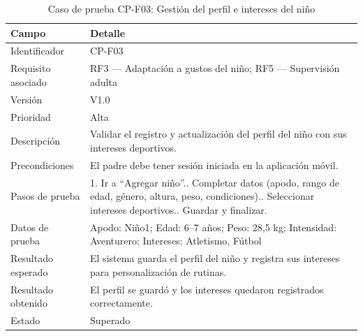 				\begin{table}[H]
					\centering\small
					\caption{Caso de prueba CP-F03: Gestión del perfil e intereses del niño}
					\label{tab:cpf03}
					\begin{tabular}{p{3cm}p{12.0cm}}
						\hline
						\textbf{Campo} & \textbf{Detalle}\\
						\hline
						Identificador & CP-F03\\
						Requisito asociado & RF3 --- Adaptación a gustos del niño; RF5 --- Supervisión adulta\\
						Versión & V1.0\\
						Prioridad & Alta\\
						Descripción & Validar el registro y actualización del perfil del niño con sus intereses deportivos.\\
						Precondiciones & El padre debe tener sesión iniciada en la aplicación móvil.\\
						Pasos de prueba & 1. Ir a ``Agregar niño''.\newline 2. Completar datos (apodo, rango de edad, género, altura, peso, condiciones).\newline 3. Seleccionar intereses deportivos.\newline 4. Guardar y finalizar.\\
						Datos de prueba & Apodo: Niño1; Edad: 6--7 años; Peso: 28,5 kg; Intensidad: Aventurero; Intereses: Atletismo, Fútbol\\
						Resultado esperado & El sistema guarda el perfil del niño y registra sus intereses para personalización de rutinas.\\
						Resultado obtenido & El perfil se guardó y los intereses quedaron registrados correctamente.\\
						Estado & Superado\\
						\hline
					\end{tabular}
				\end{table}
				\tblnote
				
